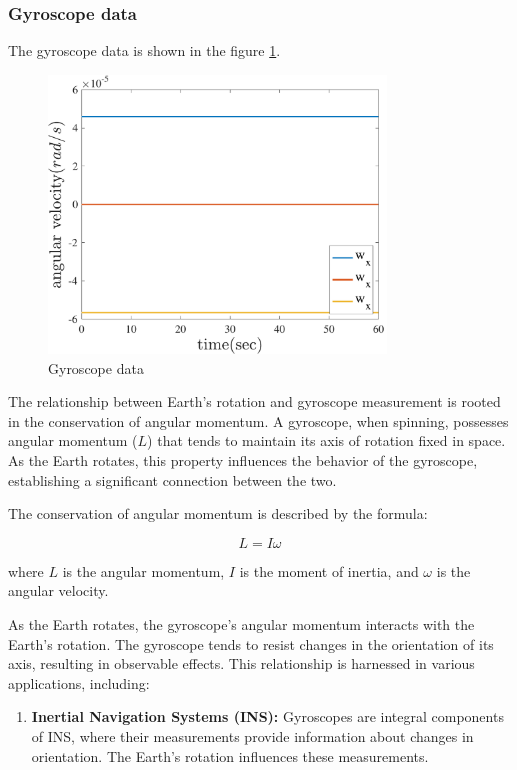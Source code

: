 \subsubsection{Gyroscope data}
The gyroscope data is shown in the figure \ref{fig:gyroscope_data}.
\begin{figure}[H]
  \centering
  \includegraphics[width=0.8\textwidth]{../Figure/Q1/immovability_w}
  \caption{Gyroscope data}
  \label{fig:gyroscope_data}
\end{figure}

The relationship between Earth's rotation and gyroscope measurement is rooted in the conservation of angular momentum. A gyroscope, when spinning, possesses angular momentum (\(L\)) that tends to maintain its axis of rotation fixed in space. As the Earth rotates, this property influences the behavior of the gyroscope, establishing a significant connection between the two.

The conservation of angular momentum is described by the formula:

\[
L = I \omega
\]

where \(L\) is the angular momentum, \(I\) is the moment of inertia, and \(\omega\) is the angular velocity.


As the Earth rotates, the gyroscope's angular momentum interacts with the Earth's rotation. The gyroscope tends to resist changes in the orientation of its axis, resulting in observable effects. This relationship is harnessed in various applications, including:

\begin{enumerate}
  \item \textbf{Inertial Navigation Systems (INS):} Gyroscopes are integral components of INS, where their measurements provide information about changes in orientation. The Earth's rotation influences these measurements.
\end{enumerate}


